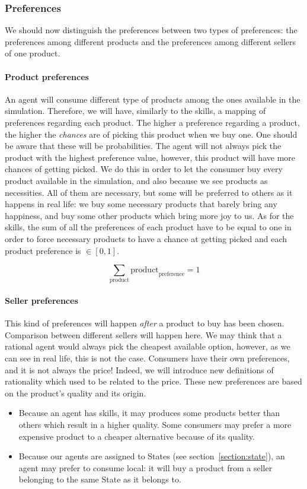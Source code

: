 \documentclass[12pt]{article}
\begin{document}
\subsubsection{Preferences}\label{section:preferences}
We should now distinguish the preferences between two types of preferences: the preferences among different products and the preferences among different sellers of one product.

\paragraph{Product preferences} An agent will consume different type of products among the ones available in the simulation. Therefore, we will have, similarly to the skills, a mapping of preferences regarding each product. The higher a preference regarding a product, the higher the \emph{chances} are of picking this product when we buy one. One should be aware that these will be probabilities. The agent will not always pick the product with the highest preference value, however, this product will have more chances of getting picked.
We do this in order to let the consumer buy every product available in the simulation, and also because we see products as necessities. All of them are necessary, but some will be preferred to others as it happens in real life: we buy some necessary products that barely bring any happiness, and buy some other products which bring more joy to us.
As for the skills, the sum of all the preferences of each product have to be equal to one in order to force necessary products to have a chance at getting picked and each product preference is $\in [0,1]$.

$$\sum_{\text{product}} \text{product}_{\text{preference}} = 1$$

\paragraph{Seller preferences}
This kind of preferences will happen \emph{after} a product to buy has been chosen. Comparison between different sellers will happen here.
We may think that a rational agent would always pick the cheapest available option, however, as we can see in real life, this is not the case. Consumers have their own preferences, and it is not always the price! Indeed, we will introduce new definitions of rationality which used to be related to the price. These new preferences are based on the product's quality and its origin.

\begin{itemize}
    \item Because an agent has skills, it may produces some products better than others which result in a higher quality. Some consumers may prefer a more expensive product to a cheaper alternative because of its quality.
    \item Because our agents are assigned to States (see section~\ref{section:state}), an agent may prefer to consume local: it will buy a product from a seller belonging to the same State as it belongs to.
\end{itemize}
\end{document}
